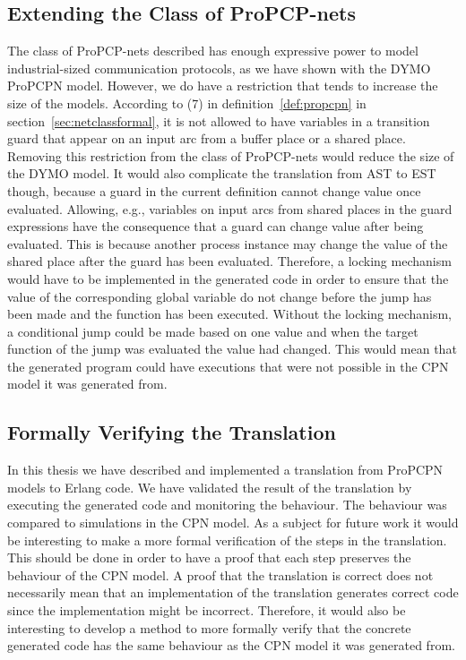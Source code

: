 \subsection{Extending the Class of ProPCP-nets}
The class of ProPCP-nets described has enough expressive power to model industrial-sized communication protocols, as we have shown with the DYMO ProPCPN model. However, we do have a restriction that tends to increase the size of the models. According to (7) in definition~\ref{def:propcpn} in section~\ref{sec:netclassformal}, it is not allowed to have variables in a transition guard that appear on an input arc from a buffer place or a shared place. Removing this restriction from the class of ProPCP-nets would reduce the size of the DYMO model. It would also complicate the translation from AST to EST though, because a guard in the current definition cannot change value once evaluated. Allowing, e.g., variables on input arcs from shared places in the guard expressions have the consequence that a guard can change value after being evaluated. This is because another process instance may change the value of the shared place after the guard has been evaluated. Therefore, a locking mechanism would have to be implemented in the generated code in order to ensure that the value of the corresponding global variable do not change before the jump has been made and the function has been executed. Without the locking mechanism, a conditional jump could be made based on one value and when the target function of the jump was evaluated the value had changed. This would mean that the generated program could have executions that were not possible in the CPN model it was generated from. 

\subsection{Formally Verifying the Translation}
In this thesis we have described and implemented a translation from ProPCPN models to Erlang code. We have validated the result of the translation by executing the generated code and monitoring the behaviour. The behaviour was compared to simulations in the CPN model. As a subject for future work it would be interesting to make a more formal verification of the steps in the translation. This should be done in order to have a proof that each step preserves the behaviour of the CPN model. A proof that the translation is correct does not necessarily mean that an implementation of the translation generates correct code since the implementation might be incorrect. Therefore, it would also be interesting to develop a method to more formally verify that the concrete generated code has the same behaviour as the CPN model it was generated from.

